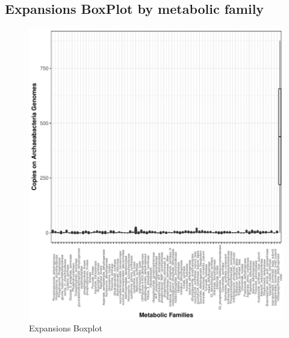 \documentclass[12pt,twoside]{reedthesis}
\begin{document}
  \subsection{Expansions BoxPlot by metabolic
  family}\label{expansions-boxplot-by-metabolic-family}
  
  \begin{Shaded}
  \begin{Highlighting}[]
  \NormalTok{(} \NormalTok{, } \NormalTok{,} \NormalTok{, } \NormalTok{,}\NormalTok{)}
  \end{Highlighting}
  \end{Shaded}
  
  \begin{figure}[h!tbp]
  \centering
  \includegraphics[angle = 0,scale = .7]{chapter2/Archaeas/expansion_plotArchaeas.pdf}
  \caption[Expansions Boxplot]{\normalsize{Expansions Boxplot}}
  \label{fig:Archaea_expansion_boxplot}
  \end{figure}
  
\end{document}
